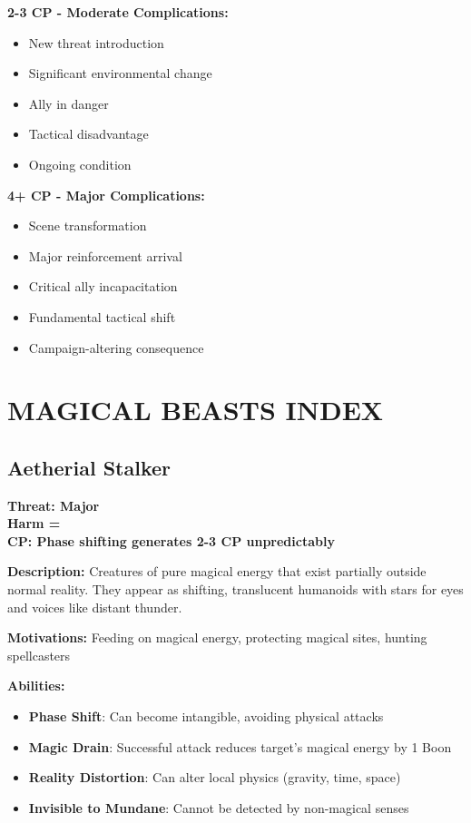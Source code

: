 \documentclass[12pt]{article}
\newcommand{\cp}[1]{\textbf{CP: #1}}
\newcommand{\harm}[1]{\textbf{Harm #1}}
\newcommand{\threat}[1]{\textbf{Threat: #1}}
\begin{document}
\begin{itemize}
\textbf{2-3 CP - Moderate Complications:}
\begin{itemize}
\item New threat introduction
\item Significant environmental change
\item Ally in danger
\item Tactical disadvantage
\item Ongoing condition
\end{itemize}

\textbf{4+ CP - Major Complications:}
\begin{itemize}
\item Scene transformation
\item Major reinforcement arrival
\item Critical ally incapacitation
\item Fundamental tactical shift
\item Campaign-altering consequence
\end{itemize}

\section{MAGICAL BEASTS INDEX}

\subsection*{Aetherial Stalker}

\threat{Major} \\
\harm{=} \\
\cp{Phase shifting generates 2-3 CP unpredictably}

\vspace{0.5em}
\textbf{Description:} Creatures of pure magical energy that exist partially outside normal reality. They appear as shifting, translucent humanoids with stars for eyes and voices like distant thunder.

\textbf{Motivations:} Feeding on magical energy, protecting magical sites, hunting spellcasters

\textbf{Abilities:}
\begin{itemize}
\item \textbf{Phase Shift}: Can become intangible, avoiding physical attacks
\item \textbf{Magic Drain}: Successful attack reduces target's magical energy by 1 Boon
\item \textbf{Reality Distortion}: Can alter local physics (gravity, time, space)
\item \textbf{Invisible to Mundane}: Cannot be detected by non-magical senses
\end{itemize}


\end{itemize}
\end{document}
